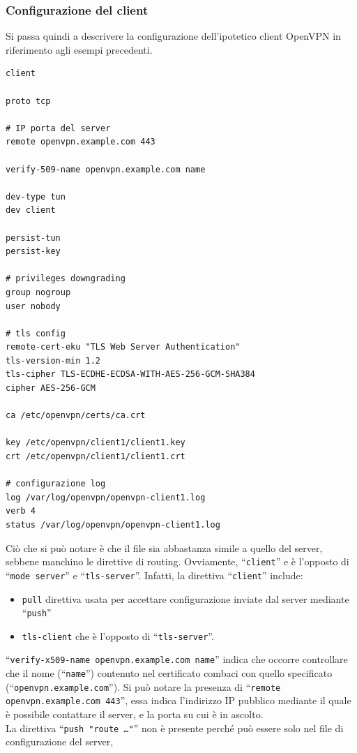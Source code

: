 \subsubsection{Configurazione del client}
Si passa quindi a descrivere la configurazione dell'ipotetico client OpenVPN in
riferimento agli esempi precedenti.
\begin{verbatim}
client
	
proto tcp
	
# IP porta del server
remote openvpn.example.com 443

verify-509-name openvpn.example.com name
	
dev-type tun
dev client
	
persist-tun
persist-key
	
# privileges downgrading
group nogroup
user nobody
	
# tls config
remote-cert-eku "TLS Web Server Authentication"
tls-version-min 1.2
tls-cipher TLS-ECDHE-ECDSA-WITH-AES-256-GCM-SHA384
cipher AES-256-GCM
	
ca /etc/openvpn/certs/ca.crt
	
key /etc/openvpn/client1/client1.key
crt /etc/openvpn/client1/client1.crt
	
# configurazione log
log /var/log/openvpn/openvpn-client1.log
verb 4
status /var/log/openvpn/openvpn-client1.log
\end{verbatim}
Ciò che si può notare è che il file sia abbastanza simile a quello del server,
sebbene manchino le direttive di routing. Ovviamente, ``\texttt{client}'' e
è l'opposto di ``\texttt{mode server}'' e
``\texttt{tls-server}''. Infatti, la direttiva ``\texttt{client}'' include:
\begin{itemize}
	\item \texttt{pull} direttiva usata per accettare configurazione inviate dal
	      server mediante ``\texttt{push}''
	\item \texttt{tls-client} che è l'opposto di ``\texttt{tls-server}''.
\end{itemize}
``\texttt{verify-x509-name openvpn.example.com name}'' indica che occorre controllare che
il nome (``\texttt{name}'') contenuto nel certificato combaci con quello specificato
(``\texttt{openvpn.example.com}''). Si può notare la presenza di ``\texttt{remote openvpn.example.com 443}'',
essa indica l'indirizzo IP pubblico mediante il quale è possibile contattare
il server, e la porta su cui è in ascolto.\\
La direttiva ``\texttt{push "route \ldots"}''
non è presente perché può essere solo nel file di configurazione del server,
